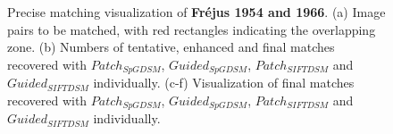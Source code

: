 \begin{figure}[htbp]
\begin{center}
{		}
		\caption{Precise matching visualization of \textbf{Fr{\'e}jus 1954 and 1966}. (a) Image pairs to be matched, with red rectangles indicating the overlapping zone. (b) Numbers of tentative, enhanced and final matches recovered with $Patch_{SpGDSM}$, $Guided_{SpGDSM}$, $Patch_{SIFTDSM}$ and $Guided_{SIFTDSM}$ individually. (c-f) Visualization of final matches recovered with $Patch_{SpGDSM}$, $Guided_{SpGDSM}$, $Patch_{SIFTDSM}$ and $Guided_{SIFTDSM}$ individually.}
		\label{MatchVizFrejus1954-1966}
	\end{center}
\end{figure} 

